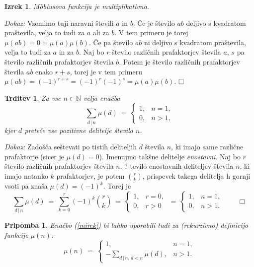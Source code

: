 \documentclass[a4paper,12pt]{article}
\def\N{\mathbb{N}} %
\def\qed{$\hfill\Box$}   %
\def\qedm{\qquad\Box}   %
\newtheorem{izrek}{Izrek}
\newtheorem{trditev}{Trditev}
\newtheorem{pripomba}{Pripomba}
\begin{document}
\begin{izrek}
\label{mimult}
M\"obiusova funkcija je multiplikativna.
\end{izrek}

\noindent
{\em Dokaz:\/} Vzemimo tuji naravni števili $a$ in $b$. Če je število $ab$ deljivo s kvadratom praštevila,
velja to tudi za $a$ ali za $b$. V tem primeru je torej $\mu(ab) = 0 = \mu(a)\mu(b)$.
Če pa število $ab$ ni deljivo s kvadratom praštevila, velja to tudi za $a$ in za $b$. Naj bo $r$ število različnih
prafaktorjev števila $a$, $s$ pa število različnih prafaktorjev števila $b$. Potem je število različnih 
prafaktorjev števila $ab$ enako $r+s$, torej je v tem primeru $\mu(ab) = (-1)^{r+s} = (-1)^r (-1)^s = \mu(a)\mu(b)$.
\qed


\begin{trditev}
Za vse $n \in \N$ velja enačba
\begin{equation}
\label{mirek}
\sum_{d\,|\,n} \mu(d)\ =\ \left\{
\begin{array}{ll}
1, & n = 1, \\
0, & n > 1,
\end{array}
\right.
\end{equation}
kjer $d$ preteče vse pozitivne delitelje števila $n$.
\end{trditev}

\noindent
{\em Dokaz:\/} 
Zadošča seštevati po tistih deliteljih $d$ števila $n$, ki imajo same različne prafaktorje (sicer je
$\mu(d) = 0$). Imenujmo takšne delitelje {\em enostavni}. Naj bo $r$ število različnih prafaktorjev
števila $n$. ? tevilo enostavnih deliteljev števila $n$, ki imajo natanko $k$ prafaktorjev, je potem ${r \choose k}$,
prispevek takega delitelja h gornji vsoti pa znaša $\mu(d) = (-1)^k$. Torej je
\[
\sum_{d\,|\,n} \mu(d)\ =\ 
\sum_{k=0}^r (-1)^k {r \choose k} \ =\ 
\left\{
\begin{array}{ll}
1, & r = 0, \\
0, & r > 0
\end{array}
\right.\ =\ \left\{
\begin{array}{ll}
1, & n = 1, \\
0, & n > 1.
\end{array}
\right. \qedm
\]

\begin{pripomba}
Enačbo (\ref{mirek}) bi lahko uporabili tudi za (rekurzivno) definicijo funkcije $\mu(n)$:
\[
\mu(n)\ =\ \left\{
\begin{array}{cl}
1, & n = 1, \\
-\displaystyle\sum_{d\,|\,n, \,d < n} \mu(d), & n > 1.
\end{array}
\right.
\]
\end{pripomba}
\end{document}
